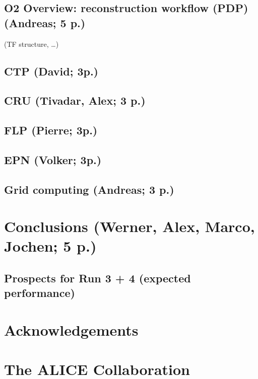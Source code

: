 \documentclass[ALICE,manyauthors]{cernphprep}
\begin{document}
\subsection{O2 Overview: reconstruction workflow (PDP) (Andreas; 5 p.)}
(TF structure, …)
\subsection{CTP (David; 3p.)}
\subsection{CRU (Tivadar, Alex; 3 p.)}
\subsection{FLP (Pierre; 3p.)}
\subsection{EPN (Volker; 3p.)}
\subsection{Grid computing (Andreas; 3 p.)}

\section{Conclusions (Werner, Alex, Marco, Jochen; 5 p.)}
\subsection{Prospects for Run 3 + 4 (expected performance)}

\cleardoublepage
\newenvironment{acknowledgement}{\relax}{\relax}
\begin{acknowledgement}
\section*{Acknowledgements}
%
\end{acknowledgement}



\newpage
\appendix

%
%

\section{The ALICE Collaboration}
\label{app:collab}
%
\end{document}
